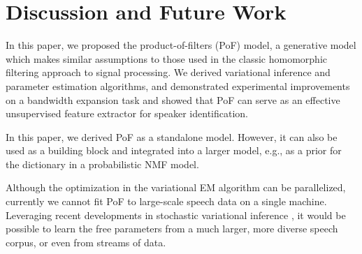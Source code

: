 \documentclass{article} %
\begin{document}


\section{Discussion and Future Work}
In this paper, we proposed the product-of-filters (PoF) model, a
generative model which makes similar assumptions to those used in the
classic homomorphic filtering approach to signal processing. We
derived variational inference and parameter estimation algorithms,
and demonstrated experimental improvements on a
bandwidth expansion task and showed that PoF can serve as an effective
unsupervised feature extractor for speaker identification.

In this paper, we derived PoF as a standalone model. However, it can also be used as
a building block and integrated into a larger model, e.g., as a prior
for the dictionary in a probabilistic NMF model.

Although the optimization in the variational EM algorithm can be parallelized,
currently we cannot fit PoF to large-scale speech data on a single
machine. Leveraging recent developments in stochastic variational
inference \cite{hoffman2013stochastic}, it would be possible to learn
the free parameters from a much larger, more diverse speech corpus, or
even from streams of data.




\end{document}
